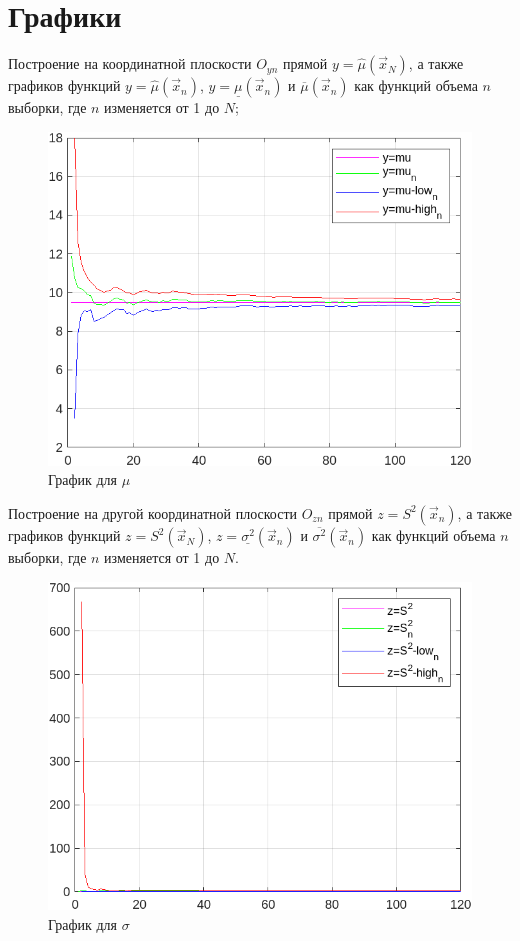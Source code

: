 \section{Графики}
Построение на координатной плоскости $O_{yn}$ прямой $y=\hat{\mu}(\vec{x}_N)$, а также графиков функций $y=\hat{\mu}(\vec{x}_n)$, $y=\underline{\mu}(\vec{x}_n)$ и $\overline{\mu}(\vec{x}_n)$ как функций объема $n$ выборки, где $n$ изменяется от 1 до $N$;
\begin{figure}[h!]
    \centering
    \includegraphics[]{images/lab_2_first.png}
    \caption{График для $\mu$}
\end{figure}
\newpage
Построение на другой координатной плоскости $O_{zn}$ прямой $z=S^2(\vec{x}_n)$, а также графиков функций $z=S^2(\vec{x}_N)$, $z=\underline{\sigma^2}(\vec{x}_n)$ и $\overline{\sigma^2}(\vec{x}_n)$ как функций объема $n$ выборки, где $n$ изменяется от 1 до $N$.
\begin{figure}[h!]
    \centering
    \includegraphics[]{images/lab_2_second.png}
    \caption{График для $\sigma$}
\end{figure}